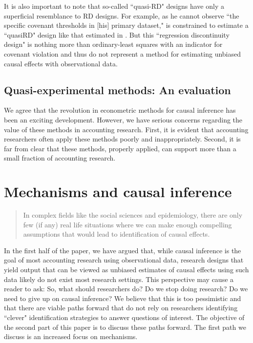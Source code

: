 \documentclass[11pt,reqno]{amsart}
\begin{document}
\begin{doublespace}
It is also important to note that so-called ``quasi-RD" designs have only a superficial resemblance to RD designs.
For example, as he cannot observe ``the specific covenant thresholds in [his] primary dataset," \citet{Tan:2013ce} is constrained to estimate a ``quasiRD" design like that estimated in \citep{Roberts:2009ka}.
But this ``regression discontinuity design"  is nothing more than ordinary-least squares with an indicator for covenant violation and thus do not represent a method for estimating unbiased causal effects with observational data.


\subsection{Quasi-experimental methods: An evaluation}
We agree that the revolution in econometric methods for causal inference has been an exciting development.
However, we have serious concerns regarding the value of these methods in accounting research. 
First, it is evident that accounting researchers often apply these methods poorly and inappropriately.
Second, it is far from clear that these methods, properly applied, can support more than a small fraction of accounting research.

\section{Mechanisms and causal inference}

\begin{quotation}
In complex fields like the social sciences and epidemiology, there are only few (if any) real life situations where we can make enough compelling assumptions that would lead to identification of causal effects.
\end{quotation}

In the first half of the paper, we have argued that, while causal inference is the goal of most accounting research using observational data, research designs that yield output that can be viewed as unbiased estimates of causal effects using such data likely do not exist most research settings.
This perspective may cause a reader to ask: 
So, what should researchers do? Do we stop doing research? Do we need to give up on causal inference? 
We believe that this is too pessimistic and that there are viable paths forward that do not rely on researchers identifying ``clever" identification strategies to answer questions of interest.
The objective of the second part of this paper is to discuss these paths forward.
The first path we discuss is an increased focus on mechanisms.


\end{doublespace}
\end{document}
